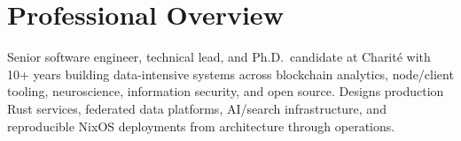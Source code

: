 



\section{Professional Overview}
Senior software engineer, technical lead, and Ph.D.\ candidate at Charit\'{e} with 10+ years building data-intensive systems across blockchain analytics, node/client tooling, neuroscience, information security, and open source. Designs production Rust services, federated data platforms, AI/search infrastructure, and reproducible NixOS deployments from architecture through operations.
{\small
\EnglishExperience
\EnglishSkills
}
\EducationEnglish
\newpage
\EnglishProjects

